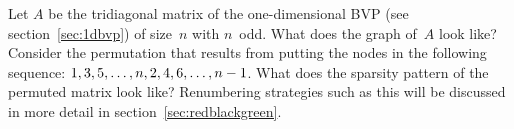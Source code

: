   \label{ex:rb-tridiagonal}
  Let $A$ be the tridiagonal matrix of the one-dimensional \ac{BVP}
  (see section~\ref{sec:1dbvp}) of size~$n$ with $n$~odd. What does
  the graph of~$A$ look like?  Consider the permutation that results
  from putting the nodes in the following sequence:
  $1,3,5,\ldots,n,2,4,\allowbreak6,\ldots,\allowbreak n-\nobreak
  1$. What does the sparsity pattern of the permuted matrix look like?
  Renumbering strategies such as this will be discussed in more detail
  in section~\ref{sec:redblackgreen}.
